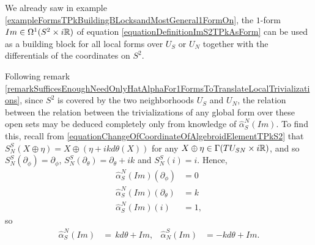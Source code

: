 We already saw in example \ref{exampleFormsTPkBuildingBLocksandMostGeneral1FormOn}, the $1$-form $Im \in \Omega^1(S^2 \times i\mathbb{R})$ of equation \eqref{equationDefinitionImS2TPkAsForm} can be used as a building block for all local forms over $U_S$ or $U_N$ together with the differentials of the coordinates on $S^2$. 

Following remark \ref{remarkSufficesEnoughNeedOnlyHatAlphaFor1FormsToTranslateLocalTrivializations}, since $S^2$ is covered by the two neighborhoods $U_S$ and $U_N$, the relation between the relation between the trivializations of any global form over these open sets may be deduced completely only from knowledge of $\hat \alpha^N_S(Im)$.
To find this, recall from \eqref{equationChangeOfCoordinateOfAlgebroidElementTPkS2} that $S^S_N(X \oplus \eta) = X \oplus (\eta + ik d\theta(X))$ for any $X \oplus \eta \in \Gamma(TU_{SN}\times i\mathbb{R})$, and so $S^S_N(\partial_\phi) = \partial_\phi$, $S^S_N(\partial_\theta) = \partial_\theta + ik$ and $S^S_N(i) = i$. Hence,
\begin{align*}
    \hat \alpha^N_S(Im)(\partial_\phi) &= 0 \\
    \hat \alpha^N_S(Im)(\partial_\theta) &= k \\
    \hat \alpha^N_S(Im)(i) &= 1,
\end{align*}
so
\begin{align}\label{equationHatAlphaImTPkS2ChangeOfCoordinatesImForm}
    \hat \alpha^N_S(Im) &= \,k d\theta + Im,&
    \hat \alpha^S_N(Im) &= -k d\theta + Im.
\end{align}


\lin 


